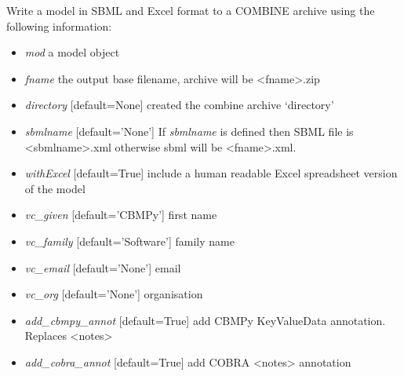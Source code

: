 \documentclass[a4paper,11pt,english]{sphinxmanual}
\begin{document}
\begin{fulllineitems}
\label{modules_doc:cbmpy.CBWrite.writeModelToCOMBINEarchive}
Write a model in SBML and Excel format to a COMBINE archive using the following information:
\begin{itemize}
\item {} 
\emph{mod} a model object

\item {} 
\emph{fname} the output base filename, archive will be \textless{}fname\textgreater{}.zip

\item {} 
\emph{directory} {[}default=None{]} created the combine archive `directory'

\item {} 
\emph{sbmlname} {[}default='None'{]} If \emph{sbmlname} is defined then SBML file is \textless{}sbmlname\textgreater{}.xml otherwise sbml will be \textless{}fname\textgreater{}.xml.

\item {} 
\emph{withExcel} {[}default=True{]} include a human readable Excel spreadsheet version of the model

\item {} 
\emph{vc\_given} {[}default='CBMPy'{]} first name

\item {} 
\emph{vc\_family} {[}default='Software'{]} family name

\item {} 
\emph{vc\_email} {[}default='None'{]} email

\item {} 
\emph{vc\_org} {[}default='None'{]} organisation

\item {} 
\emph{add\_cbmpy\_annot} {[}default=True{]} add CBMPy KeyValueData annotation. Replaces \textless{}notes\textgreater{}

\item {} 
\emph{add\_cobra\_annot} {[}default=True{]} add COBRA \textless{}notes\textgreater{} annotation

\end{itemize}

\end{fulllineitems}
\end{document}
